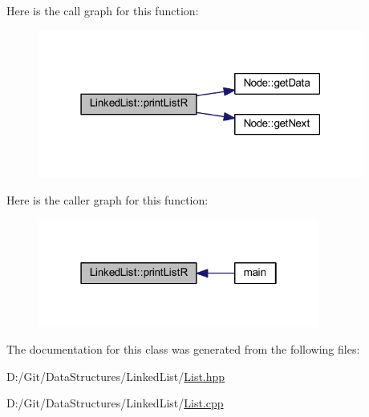 Here is the call graph for this function\+:
\nopagebreak
\begin{figure}[H]
\begin{center}
\leavevmode
\includegraphics[width=303pt]{class_linked_list_a2d03b30bf762af404a7a687aceff7123_cgraph}
\end{center}
\end{figure}
Here is the caller graph for this function\+:
\nopagebreak
\begin{figure}[H]
\begin{center}
\leavevmode
\includegraphics[width=262pt]{class_linked_list_a2d03b30bf762af404a7a687aceff7123_icgraph}
\end{center}
\end{figure}


The documentation for this class was generated from the following files\+:\begin{DoxyCompactItemize}
\item 
D\+:/\+Git/\+Data\+Structures/\+Linked\+List/\hyperlink{_list_8hpp}{List.\+hpp}\item 
D\+:/\+Git/\+Data\+Structures/\+Linked\+List/\hyperlink{_list_8cpp}{List.\+cpp}\end{DoxyCompactItemize}
